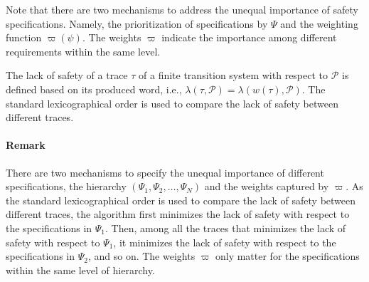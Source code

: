 Note that there are two mechanisms to address the unequal importance of safety specifications. Namely, the prioritization of specifications by $\Psi$ and the weighting function $\varpi(\psi)$.  The weights $\varpi$ indicate the importance among different requirements within the same level.

The lack of safety of a trace $\tau$ of a finite transition system with respect to $\mathcal{P}$
is defined based on its produced word, i.e., $\lambda(\tau, \mathcal{P}) = \lambda(w(\tau), \mathcal{P})$.
The standard lexicographical order is used to compare the lack of safety between different traces.

\paragraph{Remark}
There are two mechanisms to specify the unequal importance of different specifications, the hierarchy $(\Psi_1, \Psi_2, \ldots, \Psi_N)$ and the weights captured by $\varpi$.
As the standard lexicographical order is used to compare the lack of safety between different traces, the algorithm first minimizes the lack of safety with respect to the specifications in $\Psi_1$.
Then, among all the traces that minimizes the lack of safety with respect to $\Psi_1$, it minimizes the lack of safety with respect to the specifications in $\Psi_2$, and so on.
The weights $\varpi$ only matter for the specifications within the same level of hierarchy.